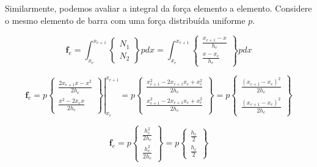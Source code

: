         Similarmente, podemos avaliar a integral da força elemento a elemento. Considere o mesmo elemento de barra com uma força distribuída uniforme $p$.


        \begin{equation*}
            \mathbf{f}_e = \int_{x_e}^{x_{e+1}} 
            \begin{Bmatrix}
            N_1\\
            N_2
            \end{Bmatrix} 
            p dx =
            \int_{x_e}^{x_{e+1}} 
            \begin{Bmatrix}
            \frac{x_{e+1}-x}{h_e}\\
            \frac{x-x_e}{h_e}
            \end{Bmatrix} 
            p dx
        \end{equation*}

        \begin{equation*}
            \mathbf{f}_e = 
            \left. p
            \begin{Bmatrix}
            \frac{2x_{e+1}x-x^2}{2h_e}\\
            \frac{x^2-2x_e x}{2h_e}
            \end{Bmatrix}\right|_{x_e}^{x_{e+1}} =
            p
            \begin{Bmatrix}
            \frac{x_{e+1}^2-2x_{e+1}x_e+x_e^2}{2h_e}\\
            \frac{x_{e+1}^2-2x_{e+1}x_e+x_e^2}{2h_e}
            \end{Bmatrix} = 
            p
            \begin{Bmatrix}
            \frac{\left(x_{e+1}-x_e\right)^2}{2h_e}\\
            \frac{\left(x_{e+1}-x_e\right)^2}{2h_e}
            \end{Bmatrix}
        \end{equation*}

        \begin{equation*}
            \mathbf{f}_e = 
            p
            \begin{Bmatrix}
            \frac{h_e^2}{2h_e}\\
            \frac{h_e^2}{2h_e}
            \end{Bmatrix} = 
            p
            \begin{Bmatrix}
            \frac{h_e}{2}\\
            \frac{h_e}{2}
            \end{Bmatrix}
        \end{equation*}


